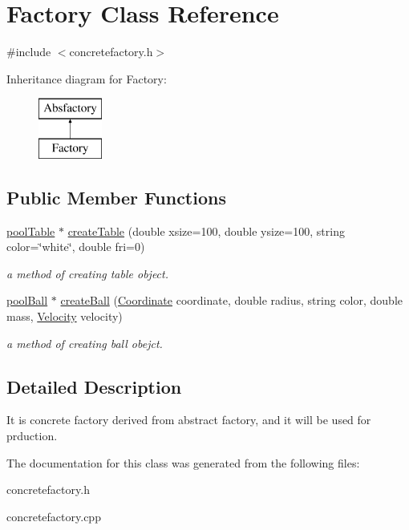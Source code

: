 \hypertarget{class_factory}{}\section{Factory Class Reference}
\label{class_factory}


{\ttfamily \#include $<$concretefactory.\+h$>$}

Inheritance diagram for Factory\+:\begin{figure}[H]
\begin{center}
\leavevmode
\includegraphics[height=2.000000cm]{class_factory}
\end{center}
\end{figure}
\subsection*{Public Member Functions}
\begin{DoxyCompactItemize}
\item 
\mbox{\label{class_factory_ab814feb40a237a087bbf1b1c4c128dc6}} 
\mbox{\hyperlink{classpool_table}{pool\+Table}} $\ast$ \mbox{\hyperlink{class_factory_ab814feb40a237a087bbf1b1c4c128dc6}{create\+Table}} (double xsize=100, double ysize=100, string color=\char`\"{}white\char`\"{}, double fri=0)
\begin{DoxyCompactList}\small\item\em a method of creating table object. \end{DoxyCompactList}\item 
\mbox{\label{class_factory_a30decbb04d0365e543bd2131eb3c9877}} 
\mbox{\hyperlink{classpool_ball}{pool\+Ball}} $\ast$ \mbox{\hyperlink{class_factory_a30decbb04d0365e543bd2131eb3c9877}{create\+Ball}} (\mbox{\hyperlink{class_coordinate}{Coordinate}} coordinate, double radius, string color, double mass, \mbox{\hyperlink{class_velocity}{Velocity}} velocity)
\begin{DoxyCompactList}\small\item\em a method of creating ball obejct. \end{DoxyCompactList}\end{DoxyCompactItemize}


\subsection{Detailed Description}
It is concrete factory derived from abstract factory, and it will be used for prduction. 

The documentation for this class was generated from the following files\+:\begin{DoxyCompactItemize}
\item 
concretefactory.\+h\item 
concretefactory.\+cpp\end{DoxyCompactItemize}
